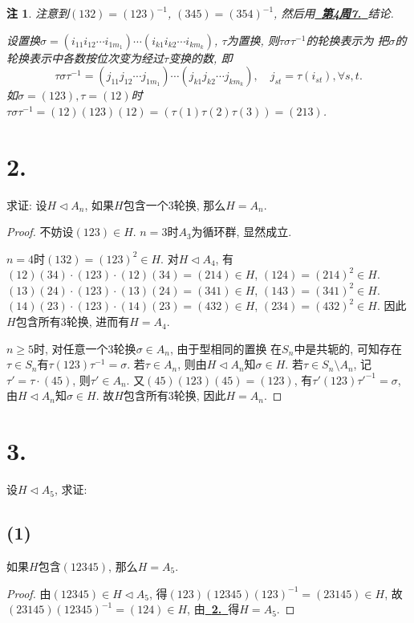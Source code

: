 \documentclass[12pt, a4paper, fontset=windows]{ctexart}
\newcommand{\myref}[2][]{\hyperref[#1]{\bf\color{blue}\ {#2}\ }}
\newtheorem*{remark}{注}
\begin{document}
\begin{remark}
注意到$(132)=(123)^{-1}$, $(345)=(354)^{-1}$, 然后用\myref[perm-conj]{第4周7.}结论. 

设置换$\sigma=(i_{11}i_{12}\cdots 
i_{1m_1})\cdots(i_{k1}i_{k2}\cdots i_{km_k})$, 
$\tau$为置换, 则$\tau\sigma\tau^{-1}$的轮换表示为
把$\sigma$的轮换表示中各数按位次变为经过$\tau$变换的数, 即
\[\tau\sigma\tau^{-1}=(j_{11}j_{12}\cdots j_{1m_1})\cdots(j_{k1}j_{k2}\cdots j_{km_k}),
\quad j_{st}=\tau(i_{st}),\forall s,t.\]
如$\sigma=(123),\tau=(12)$时$\tau\sigma\tau^{-1}=
(12)(123)(12)=(\tau(1)\tau(2)\tau(3))=(213)$. 
\end{remark}

\section*{2.}
\label{tri-An}

求证: 设$H\lhd A_n$, 如果$H$包含一个3轮换, 那么$H=A_n$. 

\begin{proof}
不妨设$(123)\in H$. $n=3$时$A_3$为循环群, 显然成立. 

$n=4$时$(132)=(123)^2\in H$. 对$H\lhd A_4$, 有
$(12)(34)\cdot(123)\cdot(12)(34)=(214)\in H$, $(124)=(214)^2\in H$. 
$(13)(24)\cdot(123)\cdot(13)(24)=(341)\in H$, $(143)=(341)^2\in H$. 
$(14)(23)\cdot(123)\cdot(14)(23)=(432)\in H$, $(234)=(432)^2\in H$. 
因此$H$包含所有3轮换, 进而有$H=A_4$. 

$n\ge 5$时, 对任意一个3轮换$\sigma\in A_n$, 由于型相同的置换
在$S_n$中是共轭的, 可知存在$\tau\in S_n$有$\tau(123)\tau^{-1}=\sigma$. 
若$\tau\in A_n$, 则由$H\lhd A_n$知$\sigma\in H$. 
若$\tau\in S_n\setminus A_n$, 
记$\tau'=\tau\cdot(45)$, 则$\tau'\in A_n$. 
又$(45)(123)(45)=(123)$, 有$\tau'(123)\tau'^{-1}=\sigma$, 
由$H\lhd A_n$知$\sigma\in H$. 故$H$包含所有3轮换, 因此$H=A_n$. 
\end{proof}

\section*{3.}

设$H\lhd A_5$, 求证: 

\subsection*{(1)}

如果$H$包含$(12345)$, 那么$H=A_5$. 

\begin{proof}
由$(12345)\in H\lhd A_5$, 得$(123)(12345)(123)^{-1}=(23145)\in H$, 
故$(23145)(12345)^{-1}=(124)\in H$, 由\myref[tri-An]{2.}得$H=A_5$. 
\end{proof}
\end{document}
